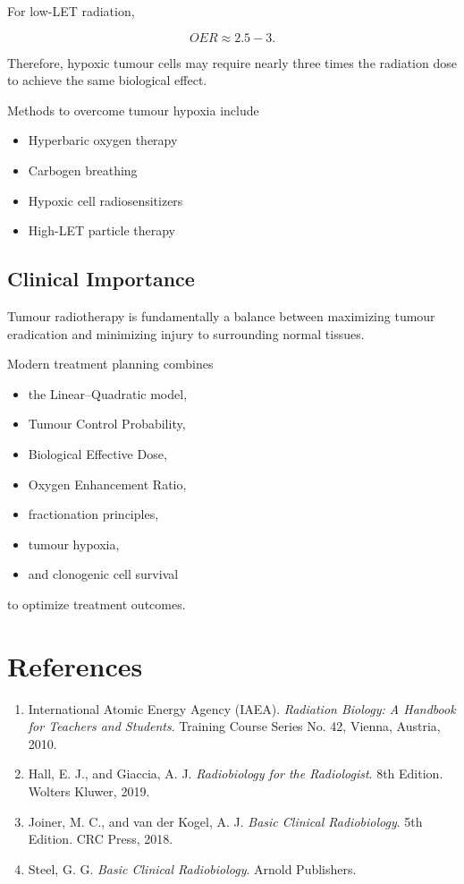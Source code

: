 \documentclass[12pt]{article}
\begin{document}
For low-LET radiation,

\[
OER\approx2.5-3.
\]

Therefore, hypoxic tumour cells may require nearly three times the radiation dose to achieve the same biological effect.

Methods to overcome tumour hypoxia include

\begin{itemize}
\item Hyperbaric oxygen therapy
\item Carbogen breathing
\item Hypoxic cell radiosensitizers
\item High-LET particle therapy
\end{itemize}


\subsection{Clinical Importance}

Tumour radiotherapy is fundamentally a balance between maximizing tumour eradication and minimizing injury to surrounding normal tissues.

Modern treatment planning combines

\begin{itemize}
\item the Linear--Quadratic model,
\item Tumour Control Probability,
\item Biological Effective Dose,
\item Oxygen Enhancement Ratio,
\item fractionation principles,
\item tumour hypoxia,
\item and clonogenic cell survival
\end{itemize}

to optimize treatment outcomes.


\section{References}

\begin{enumerate}
\item International Atomic Energy Agency (IAEA). \textit{Radiation Biology: A Handbook for Teachers and Students}. Training Course Series No. 42, Vienna, Austria, 2010.

\item Hall, E. J., and Giaccia, A. J. \textit{Radiobiology for the Radiologist}. 8th Edition. Wolters Kluwer, 2019.

\item Joiner, M. C., and van der Kogel, A. J. \textit{Basic Clinical Radiobiology}. 5th Edition. CRC Press, 2018.

\item Steel, G. G. \textit{Basic Clinical Radiobiology}. Arnold Publishers.
\end{enumerate}
\end{document}
